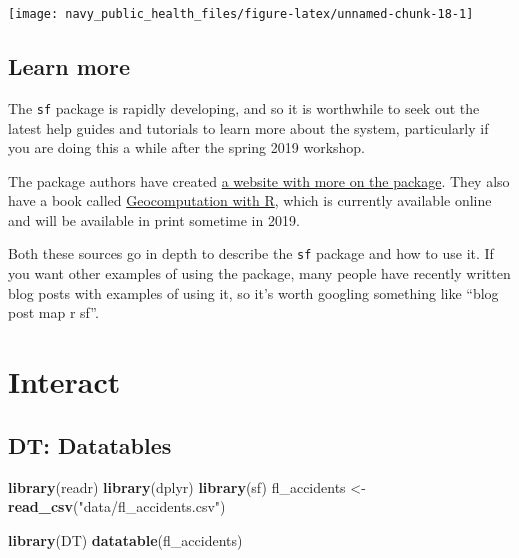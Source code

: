 \documentclass[]{tufte-book}
\newenvironment{Shaded}{}{}
\newcommand{\KeywordTok}[1]{\textcolor[rgb]{0.00,0.44,0.13}{\textbf{#1}}}
\newcommand{\NormalTok}[1]{#1}
\newcommand{\StringTok}[1]{\textcolor[rgb]{0.25,0.44,0.63}{#1}}
\begin{document}
\texttt{[image: navy\_public\_health\_files/figure-latex/unnamed-chunk-18-1]}

\hypertarget{learn-more-1}{%
\section{Learn more}\label{learn-more-1}}

The \texttt{sf} package is rapidly developing, and so it is worthwhile to seek out the latest
help guides and tutorials to learn more about the system, particularly if you are doing
this a while after the spring 2019 workshop.

The package authors have created
\href{https://cran.r-project.org/web/packages/sf/vignettes/sf1.html}{a website with more on the package}.
They also have a book called \href{https://geocompr.robinlovelace.net/}{Geocomputation with R}, which
is currently available online and will be available in print sometime in 2019.

Both these sources go in depth to describe the \texttt{sf} package and how to use it. If you want
other examples of using the package, many people have recently written blog posts with examples
of using it, so it's worth googling something like ``blog post map r sf''.

\hypertarget{interact}{%
\chapter{Interact}\label{interact}}

\hypertarget{dt-datatables}{%
\section{DT: Datatables}\label{dt-datatables}}

\begin{Shaded}
\begin{Highlighting}[]
\KeywordTok{library}\NormalTok{(readr)}
\KeywordTok{library}\NormalTok{(dplyr)}
\KeywordTok{library}\NormalTok{(sf)}
\NormalTok{fl_accidents <-}\StringTok{ }\KeywordTok{read_csv}\NormalTok{(}\StringTok{"data/fl_accidents.csv"}\NormalTok{)}
\end{Highlighting}
\end{Shaded}

\begin{Shaded}
\begin{Highlighting}[]
\KeywordTok{library}\NormalTok{(DT)}
\KeywordTok{datatable}\NormalTok{(fl_accidents)}
\end{Highlighting}
\end{Shaded}
\end{document}
